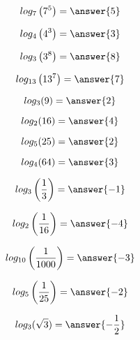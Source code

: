 \documentclass{ximera}
\author{Lee Wayand}
\begin{document}
\begin{example}













\[
log_7\left( 7^5 \right) = \answer{5}
\]





\[
log_4\left( 4^3 \right) = \answer{3}
\]







\[
log_3\left( 3^8 \right) = \answer{8}
\]





\[
log_{13}\left( 13^7 \right) = \answer{7}
\]









\[
log_3(9) = \answer{2}
\]





\[
log_2(16) = \answer{4}
\]






\[
log_5(25) = \answer{2}
\]





\[
log_4(64) = \answer{3}
\]
















\[
log_3\left( \frac{1}{3} \right) = \answer{-1}
\]






\[
log_2\left( \frac{1}{16} \right) = \answer{-4}
\]






\[
log_{10}\left( \frac{1}{1000} \right) = \answer{-3}
\]





\[
log_5\left( \frac{1}{25} \right) = \answer{-2}
\]









\[
log_3(\sqrt{3}) = \answer{-\frac{1}{2}}
\]












\end{example}
\end{document}
